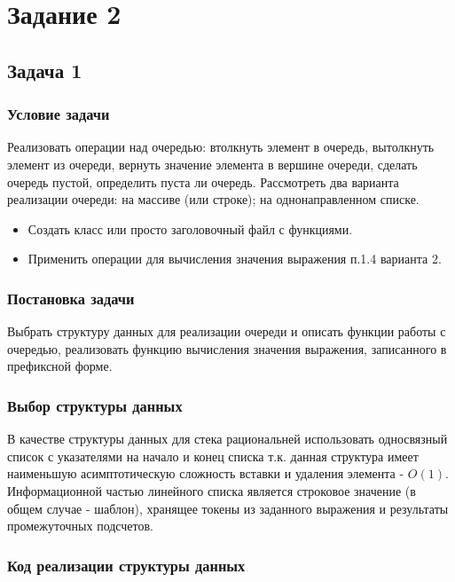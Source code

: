 \documentclass[a4paper, 14pt]{extarticle}
\begin{document}
\section{Задание 2}
\subsection{Задача 1}
\subsubsection{Условие задачи}
Реализовать операции над очередью: втолкнуть элемент в очередь,
вытолкнуть элемент из очереди, вернуть значение элемента в вершине
очереди, сделать очередь пустой, определить пуста ли очередь.
Рассмотреть два варианта реализации очереди: на массиве (или строке);
на однонаправленном списке.
\begin{itemize}
 \item Создать класс или просто заголовочный файл с функциями.
 \item Применить операции для вычисления значения выражения п.1.4 варианта 2.
 \end{itemize}
\subsubsection{Постановка задачи}
Выбрать структуру данных для реализации очереди и описать функции
работы с очередью, реализовать функцию вычисления значения выражения,
записанного в префиксной форме.
\subsubsection{Выбор структуры данных}
В качестве структуры данных для стека рациональней использовать
односвязный список с указателями на начало и конец списка т.к. данная структура имеет
наименьшую асимптотическую сложность вставки и удаления элемента - $O(1)$.
Информационной частью линейного списка является строковое значение (в общем случае - шаблон),
хранящее токены из заданного выражения и результаты промежуточных подсчетов.
\subsubsection{Код реализации структуры данных}

\end{document}
